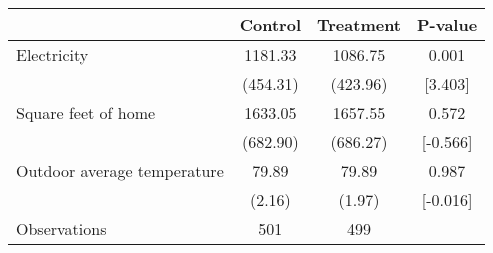 \begin{tabular}{lccc}
\toprule
 & Control & Treatment & P-value \\
\midrule
Electricity & 1181.33 & 1086.75 & 0.001 \\
  & (454.31) & (423.96) & [3.403] \\
Square feet of home & 1633.05 & 1657.55 & 0.572 \\
  & (682.90) & (686.27) & [-0.566] \\
Outdoor average temperature & 79.89 & 79.89 & 0.987 \\
  & (2.16) & (1.97) & [-0.016] \\
Observations & 501 & 499 &   \\
\bottomrule
\end{tabular}
